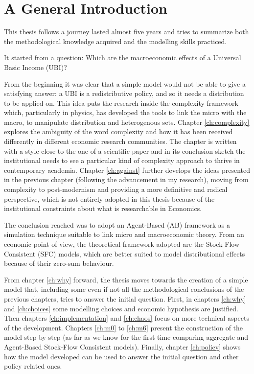 \chapter*{A General Introduction}

This thesis follows a journey lasted almost five years and tries to summarize both the methodological knowledge acquired and the modelling skills practiced.

It started from a question: Which are the macroeconomic effects of a Universal Basic Income (UBI)?

From the beginning it was clear that a simple model would not be able to give a satisfying answer: a UBI is a redistributive policy, and so it needs a distribution to be applied on.
This idea puts the research inside the complexity framework which, particularly in physics, has developed the tools to link the micro with the macro, to manipulate distribution and heterogenous sets.
Chapter \ref{ch:complexity} explores the ambiguity of the word complexity and how it has been received differently in different economic research communities.
The chapter is written with a style close to the one of a scientific paper and in its conclusion sketch the institutional needs to see a particular kind of complexity approach to thrive in contemporary academia.
Chapter \ref{ch:against} further develops the ideas presented in the previous chapter (following the advancement in my research), moving from complexity to post-modernism and providing a more definitive and radical perspective, which is not entirely adopted in this thesis because of the institutional constraints about what is researchable in Economics.

The conclusion reached was to adopt an Agent-Based (AB) framework as a simulation technique suitable to link micro and macroeconomic theory.
From an economic point of view, the theoretical framework adopted are the Stock-Flow Consistent (SFC) models, which are better suited to model distributional effects because of their zero-sum behaviour.

From chapter \ref{ch:why} forward, the thesis moves towards the creation of a simple model that, including some even if not all the methodological conclusions of the previous chapters, tries to answer the initial question.
First, in chapters \ref{ch:why} and \ref{ch:choices} some modelling choices and economic hypothesis are justified.
Then chapters \ref{ch:implementation} and \ref{ch:chaos} focus on more technical aspects of the development.
Chapters \ref{ch:m0} to \ref{ch:m6} present the construction of the model step-by-step (as far as we know for the first time comparing aggregate and Agent-Based Stock-Flow Consistent models).
Finally, chapter \ref{ch:policy} shows how the model developed can be used to answer the initial question and other policy related ones.

